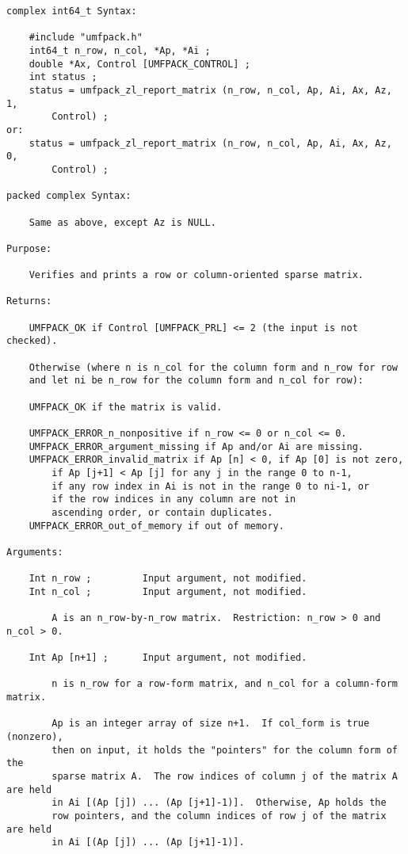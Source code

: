 \documentclass[11pt]{article}
\begin{document}
{\begin{verbatim}
complex int64_t Syntax:

    #include "umfpack.h"
    int64_t n_row, n_col, *Ap, *Ai ;
    double *Ax, Control [UMFPACK_CONTROL] ;
    int status ;
    status = umfpack_zl_report_matrix (n_row, n_col, Ap, Ai, Ax, Az, 1,
        Control) ;
or:
    status = umfpack_zl_report_matrix (n_row, n_col, Ap, Ai, Ax, Az, 0,
        Control) ;

packed complex Syntax:

    Same as above, except Az is NULL.

Purpose:

    Verifies and prints a row or column-oriented sparse matrix.

Returns:

    UMFPACK_OK if Control [UMFPACK_PRL] <= 2 (the input is not checked).

    Otherwise (where n is n_col for the column form and n_row for row
    and let ni be n_row for the column form and n_col for row):

    UMFPACK_OK if the matrix is valid.

    UMFPACK_ERROR_n_nonpositive if n_row <= 0 or n_col <= 0.
    UMFPACK_ERROR_argument_missing if Ap and/or Ai are missing.
    UMFPACK_ERROR_invalid_matrix if Ap [n] < 0, if Ap [0] is not zero,
        if Ap [j+1] < Ap [j] for any j in the range 0 to n-1,
        if any row index in Ai is not in the range 0 to ni-1, or
        if the row indices in any column are not in
        ascending order, or contain duplicates.
    UMFPACK_ERROR_out_of_memory if out of memory.

Arguments:

    Int n_row ;         Input argument, not modified.
    Int n_col ;         Input argument, not modified.

        A is an n_row-by-n_row matrix.  Restriction: n_row > 0 and n_col > 0.

    Int Ap [n+1] ;      Input argument, not modified.

        n is n_row for a row-form matrix, and n_col for a column-form matrix.

        Ap is an integer array of size n+1.  If col_form is true (nonzero),
        then on input, it holds the "pointers" for the column form of the
        sparse matrix A.  The row indices of column j of the matrix A are held
        in Ai [(Ap [j]) ... (Ap [j+1]-1)].  Otherwise, Ap holds the
        row pointers, and the column indices of row j of the matrix are held
        in Ai [(Ap [j]) ... (Ap [j+1]-1)].


\end{verbatim}}
\end{document}

